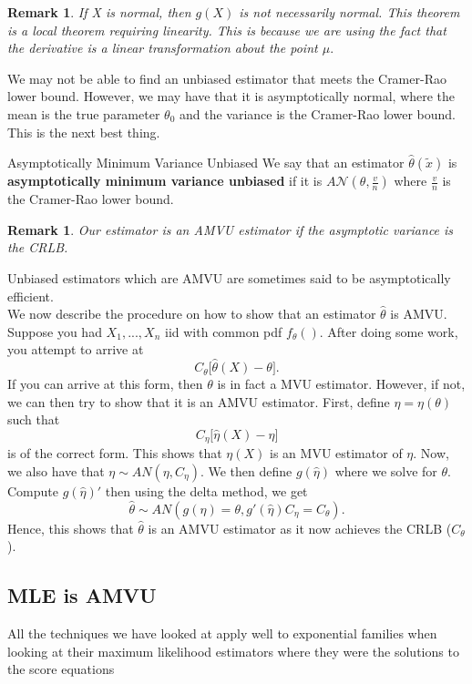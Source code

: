 \documentclass[twoside]{article}
\newtheorem{remark}[theorem]{Remark}
\begin{document}
\begin{remark}If X is normal, then $g(X)$ is not necessarily normal. This theorem is a local theorem requiring linearity. This is because we are using the fact that the derivative is a linear transformation about the point $\mu.$
\end{remark}

We may not be able to find an unbiased estimator that meets the Cramer-Rao lower bound. However, we may have that it is asymptotically normal, where the mean is the true parameter $\theta_0$ and the variance is the Cramer-Rao lower bound. This is the next best thing. 

\begin{definition_exam}{Asymptotically Minimum Variance Unbiased}{} We say that an estimator $\hat{\theta}(\tilde{x})$ is \textbf{asymptotically minimum variance unbiased} if it is $A\mathcal{N}(\theta, \frac{v}{n})$ where $\frac{v}{n}$ is the Cramer-Rao lower bound.
\end{definition_exam}

\begin{remark}Our estimator is an AMVU estimator if the asymptotic variance is the CRLB.
\end{remark}
Unbiased estimators which are AMVU are sometimes said to be asymptotically efficient.\\

We now describe the procedure on how to show that an estimator $\hat{\theta}$ is AMVU. Suppose you had $X_1,...,X_n$ iid with common pdf $f_{\theta}().$ After doing some work, you attempt to arrive at 
$$
C_{\theta}\bigg[\hat{\theta}(X) - \theta \bigg].
$$
If you can arrive at this form, then $\theta$ is in fact a MVU estimator. However, if not, we can then try to show that it is an AMVU estimator. First, define $\eta = \eta(\theta)$ such that 
$$
C_{\eta}\bigg[ \hat{\eta}(X) - \eta \bigg]
$$
is of the correct form. This shows that $\eta(X)$ is an MVU estimator of $\eta.$ Now, we also have that $\eta \sim AN(\eta, C_{\eta})$. We then define $g(\hat{\eta})$ where we solve for $\theta$. Compute $g(\hat{\eta})'$ then using the delta method, we get 
$$
\hat{\theta} \sim AN(g(\hat{\eta}) = \theta, g'(\hat{\eta})C_{\eta} = C_{\theta}).
$$
Hence, this shows that $\hat{\theta}$ is an AMVU estimator as it now achieves the CRLB ($C_{\theta}$).

\subsection{MLE is AMVU}
All the techniques we have looked at apply well to exponential families when looking at their maximum likelihood estimators where they were the solutions to the score equations
\end{document}
